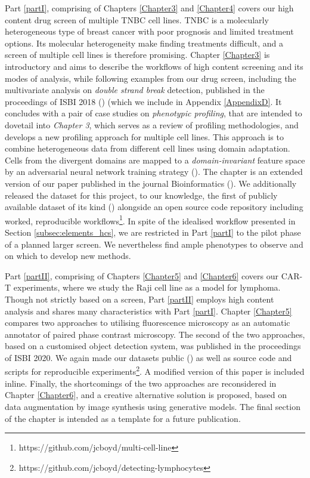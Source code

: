 Part \ref{partI}, comprising of Chapters \ref{Chapter3} and \ref{Chapter4} covers our high content drug screen of multiple TNBC cell lines. TNBC is a molecularly heterogeneous type of breast cancer with poor prognosis and limited treatment options. Its molecular heterogeneity make finding treatments difficult, and a screen of multiple cell lines is therefore promising. Chapter \ref{Chapter3} is introductory and aims to describe the workflows of high content screening and its modes of analysis, while following examples from our drug screen, including the multivariate analysis on \emph{double strand break} detection, published in the proceedings of ISBI 2018 (\cite{boyd2018analysing}) (which we include in Appendix \ref{AppendixD}. It concludes with a pair of case studies on \emph{phenotypic profiling}, that are intended to dovetail into \emph{Chapter 3}, which serves as a review of profiling methodologies, and develops a new profiling approach for multiple cell lines. This approach is to combine heterogeneous data from different cell lines using domain adaptation. Cells from the divergent domains are mapped to a \emph{domain-invariant} feature space by an adversarial neural network training strategy (\cite{ajakan2014domain}). The chapter is an extended version of our paper published in the journal Bioinformatics (\cite{boyd2020domain}). We additionally released the dataset for this project, to our knowledge, the first of publicly available dataset of its kind (\cite{Boyd_Reyal_Pinheiro_Del_Nery_Walter_2019}) alongside an open source code repository including worked, reproducible workflows\footnote{https://github.com/jcboyd/multi-cell-line}. In spite of the idealised workflow presented in Section \ref{subsec:elements_hcs}, we are restricted in Part \ref{partI} to the pilot phase of a planned larger screen. We nevertheless find ample phenotypes to observe and on which to develop new methods.

Part \ref{partII}, comprising of Chapters \ref{Chapter5} and \ref{Chapter6} covers our CAR-T experiments, where we study the Raji cell line as a model for lymphoma. Though not strictly based on a screen, Part \ref{partII} employs high content analysis and shares many characteristics with Part \ref{partI}. Chapter \ref{Chapter5} compares two approaches to utilising fluorescence microscopy as an automatic annotator of paired phase contrast microscopy. The second of the two approaches, based on a customised object detection system, was published in the proceedings of ISBI 2020. We again made our datasets public (\cite{Boyd_Gouveia_Perez_Walter_2019}) as well as source code and scripts for reproducible experiments\footnote{https://github.com/jcboyd/detecting-lymphocytes}.  A modified version of this paper is included inline. Finally, the shortcomings of the two approaches are reconsidered in Chapter \ref{Chapter6}, and a creative alternative solution is proposed, based on data augmentation by image synthesis using generative models. The final section of the chapter is intended as a template for a future publication. 

